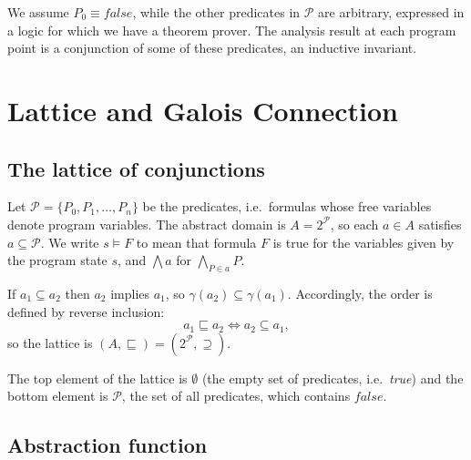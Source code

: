 We assume $P_0 \equiv \mathit{false}$, while the other predicates in $\mathcal{P}$ are arbitrary, expressed in a logic for which we have a theorem prover. The analysis result at each program point is a conjunction of some of these predicates, an inductive invariant.
 
\section{Lattice and Galois Connection}
 
\subsection*{The lattice of conjunctions}
 
Let $\mathcal{P} = \{P_0, P_1, \ldots, P_n\}$ be the predicates, i.e.\ formulas whose free variables denote program variables. The abstract domain is $A = 2^{\mathcal{P}}$, so each $a \in A$ satisfies $a \subseteq \mathcal{P}$. We write $s \models F$ to mean that formula $F$ is true for the variables given by the program state $s$, and $\bigwedge a$ for $\bigwedge_{P \in a} P$.
 
 
If $a_1 \subseteq a_2$ then $a_2$ implies $a_1$, so $\gamma(a_2) \subseteq \gamma(a_1)$. Accordingly, the order is defined by reverse inclusion:
\[
a_1 \sqsubseteq a_2 \iff a_2 \subseteq a_1,
\]
so the lattice is $(A, \sqsubseteq) = (2^{\mathcal{P}}, \supseteq)$.
 
 
 
The top element of the lattice is $\emptyset$ (the empty set of predicates, i.e.\ \emph{true}) and the bottom element is $\mathcal{P}$, the set of all predicates, which contains $\mathit{false}$.
 
\subsection*{Abstraction function}
 
